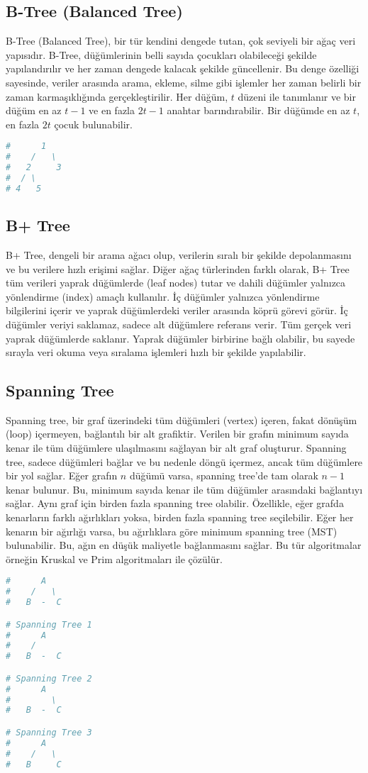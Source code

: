 \newpage

\subsection{B-Tree (Balanced Tree)}

B-Tree (Balanced Tree), bir tür kendini dengede tutan, çok seviyeli bir ağaç veri yapısıdır. B-Tree, düğümlerinin belli sayıda çocukları olabileceği şekilde yapılandırılır ve her zaman dengede kalacak şekilde güncellenir. Bu denge özelliği sayesinde, veriler arasında arama, ekleme, silme gibi işlemler her zaman belirli bir zaman karmaşıklığında gerçekleştirilir. Her düğüm, $t$ düzeni ile tanımlanır ve bir düğüm en az $t-1$ ve en fazla $2t-1$ anahtar barındırabilir. Bir düğümde en az $t$, en fazla $2t$ çocuk bulunabilir.

\begin{lstlisting}[language=Python]
#      1
#    /   \
#   2     3
#  / \  
# 4   5 
\end{lstlisting}

\newpage

\subsection{B+ Tree}

B+ Tree, dengeli bir arama ağacı olup, verilerin sıralı bir şekilde depolanmasını ve bu verilere hızlı erişimi sağlar. Diğer ağaç türlerinden farklı olarak, B+ Tree tüm verileri yaprak düğümlerde (leaf nodes) tutar ve dahili düğümler yalnızca yönlendirme (index) amaçlı kullanılır. İç düğümler yalnızca yönlendirme bilgilerini içerir ve yaprak düğümlerdeki veriler arasında köprü görevi görür. İç düğümler veriyi saklamaz, sadece alt düğümlere referans verir. Tüm gerçek veri yaprak düğümlerde saklanır. Yaprak düğümler birbirine bağlı olabilir, bu sayede sırayla veri okuma veya sıralama işlemleri hızlı bir şekilde yapılabilir.

\newpage

\subsection{Spanning Tree}

Spanning tree, bir graf üzerindeki tüm düğümleri (vertex) içeren, fakat dönüşüm (loop) içermeyen, bağlantılı bir alt grafiktir. Verilen bir grafın minimum sayıda kenar ile tüm düğümlere ulaşılmasını sağlayan bir alt graf oluşturur. Spanning tree, sadece düğümleri bağlar ve bu nedenle döngü içermez, ancak tüm düğümlere bir yol sağlar. Eğer grafın $n$ düğümü varsa, spanning tree'de tam olarak $n-1$ kenar bulunur. Bu, minimum sayıda kenar ile tüm düğümler arasındaki bağlantıyı sağlar.  Aynı graf için birden fazla spanning tree olabilir. Özellikle, eğer grafda kenarların farklı ağırlıkları yoksa, birden fazla spanning tree seçilebilir. Eğer her kenarın bir ağırlığı varsa, bu ağırlıklara göre minimum spanning tree (MST) bulunabilir. Bu, ağın en düşük maliyetle bağlanmasını sağlar. Bu tür algoritmalar örneğin Kruskal ve Prim algoritmaları ile çözülür.

\begin{lstlisting}[language=Python]
#      A
#    /   \
#   B  -  C 

# Spanning Tree 1
#      A
#    /
#   B  -  C 

# Spanning Tree 2
#      A
#        \
#   B  -  C 

# Spanning Tree 3
#      A
#    /   \
#   B     C 
\end{lstlisting}

\newpage